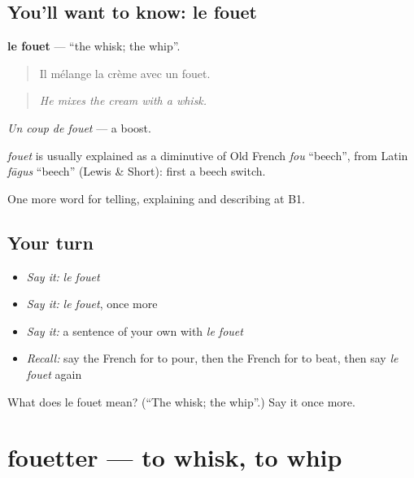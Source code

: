 \subsection*{You'll want to know: le fouet}
\textbf{le fouet} — \textquotedblleft{}the whisk; the whip\textquotedblright{}.

\begin{quote}
Il mélange la crème avec un fouet.
\end{quote}

\begin{quote}
\emph{He mixes the cream with a whisk.}
\end{quote}

\emph{Un coup de fouet} — a boost.

\begin{cousinweb}
\emph{fouet} is usually explained as a diminutive of Old French \emph{fou} \textquotedblleft{}beech\textquotedblright{}, from Latin \emph{fāgus} \textquotedblleft{}beech\textquotedblright{} (Lewis \& Short): first a beech switch.
\end{cousinweb}

\begin{grammarlens}[title={What you've built}]
One more word for telling, explaining and describing at B1.
\end{grammarlens}

\subsection*{Your turn}
\begin{itemize}
\raggedright
  \item \emph{Say it:} \emph{le fouet}
  \item \emph{Say it:} \emph{le fouet}, once more
  \item \emph{Say it:} a sentence of your own with \emph{le fouet}
  \item \emph{Recall:} say the French for to pour, then the French for to beat, then say \emph{le fouet} again
\end{itemize}

\begin{tcolorbox}[breakable,colback=teal!4,colframe=teal!35!black,title={Before you move on}]
What does le fouet mean? (\textquotedblleft{}The whisk; the whip\textquotedblright{}.) Say it once more.
\end{tcolorbox}
\section[fouetter]{fouetter — to whisk, to whip}

